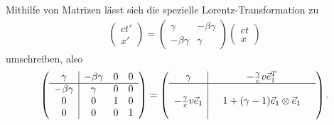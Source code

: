 Mithilfe von Matrizen lässt sich die spezielle Lorentz-Transformation zu
\begin{align*}
    \begin{pmatrix}ct' \\ x' \end{pmatrix} = \begin{pmatrix}\gamma&-\beta\gamma \\ -\beta\gamma &\gamma \end{pmatrix} \begin{pmatrix}ct \\ x \end{pmatrix}
\end{align*}
umschreiben, also
\begin{align*}
    \left(\begin{array}{c|ccc}
              \gamma       & -\beta\gamma & 0 & 0 \\
              \hline
              -\beta\gamma & \gamma       & 0 & 0 \\
              0            & 0            & 1 & 0 \\
              0            & 0            & 0 & 1
          \end{array}\right)
    =\left(\begin{array}{c|ccc}
               \gamma                      &  & -\frac{\gamma}{c}v\vec{e}_1^T           & \\
               \hline
                                           &  &                                         & \\
               -\frac{\gamma}{c}v\vec{e}_1 &  & 1 + (\gamma-1)\vec{e}_1\otimes\vec{e}_1 & \\
                                           &  &                                         &
           \end{array}\right).
\end{align*}

